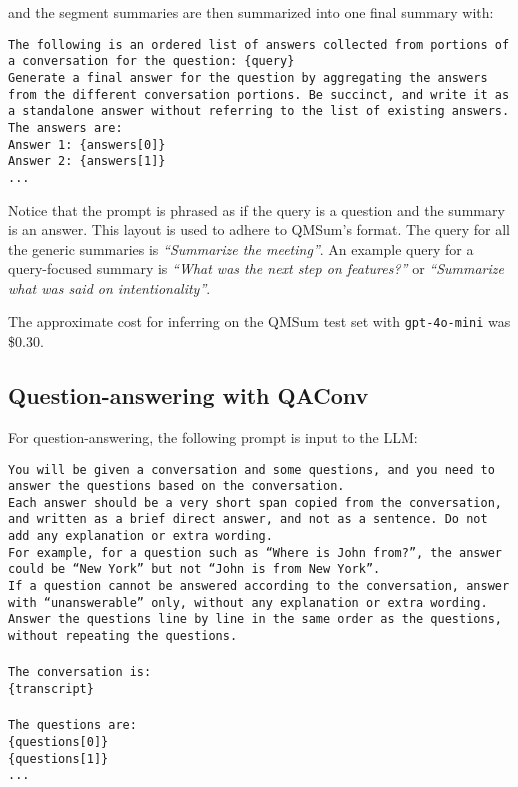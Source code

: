 \noindent
and the segment summaries are then summarized into one final summary with:

\begin{tcolorbox}[colback=gray!10, colframe=gray!50, sharp corners, boxrule=0.5mm]
\texttt{The following is an ordered list of answers collected from portions of a conversation for the question: \{query\}\\
Generate a final answer for the question by aggregating the answers from the different conversation portions. Be succinct, and write it as a standalone answer without referring to the list of existing answers. The answers are:\\
Answer 1: \{answers[0]\}\\
Answer 2: \{answers[1]\}\\
...
}
\end{tcolorbox}

Notice that the prompt is phrased as if the query is a question and the summary is an answer. This layout is used to adhere to QMSum's format. The query for all the generic summaries is \textit{``Summarize the meeting''}. An example query for a query-focused summary is \textit{``What was the next step on features?''} or \textit{``Summarize what was said on intentionality''}.

The approximate cost for inferring on the QMSum test set with \texttt{gpt-4o-mini} was \$0.30.


\subsection{Question-answering with QAConv}
\label{sec_appendix_prompts_qaconv}

For question-answering, the following prompt is input to the LLM:

\begin{tcolorbox}[colback=gray!10, colframe=gray!50, sharp corners, boxrule=0.5mm]
\texttt{You will be given a conversation and some questions, and you need to answer the questions based on the conversation.\\
Each answer should be a very short span copied from the conversation, and written as a brief direct answer, and not as a sentence. Do not add any explanation or extra wording.\\
For example, for a question such as ``Where is John from?'', the answer could be ``New York'' but not ``John is from New York''.\\
If a question cannot be answered according to the conversation, answer with ``unanswerable'' only, without any explanation or extra wording.\\
Answer the questions line by line in the same order as the questions, without repeating the questions.\\\\
The conversation is:\\\{transcript\}\\\\
The questions are:\\
\{questions[0]\}\\
\{questions[1]\}\\
...}
\end{tcolorbox}

